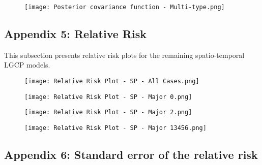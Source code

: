 \documentclass[a4paper]{thesis}
\begin{document}
\begin{figure}[H]
\begin{center}
\texttt{[image: Posterior covariance function - Multi-type.png]}
\end{center}
\end{figure}

\subsection{Appendix 5: Relative Risk}

This subsection presents relative risk plots for the remaining spatio-temporal LGCP models. 

\begin{figure}[H]
\begin{center}
\texttt{[image: Relative Risk Plot - SP - All Cases.png]}
\end{center}
\end{figure}

\begin{figure}[H]
\begin{center}
\texttt{[image: Relative Risk Plot - SP - Major 0.png]}
\end{center}
\end{figure}

\begin{figure}[H]
\begin{center}
\texttt{[image: Relative Risk Plot - SP - Major 2.png]}
\end{center}
\end{figure}

\begin{figure}[H]
\begin{center}
\texttt{[image: Relative Risk Plot - SP - Major 13456.png]}
\end{center}
\end{figure}

\newpage

\subsection{Appendix 6: Standard error of the relative risk}
\end{document}
